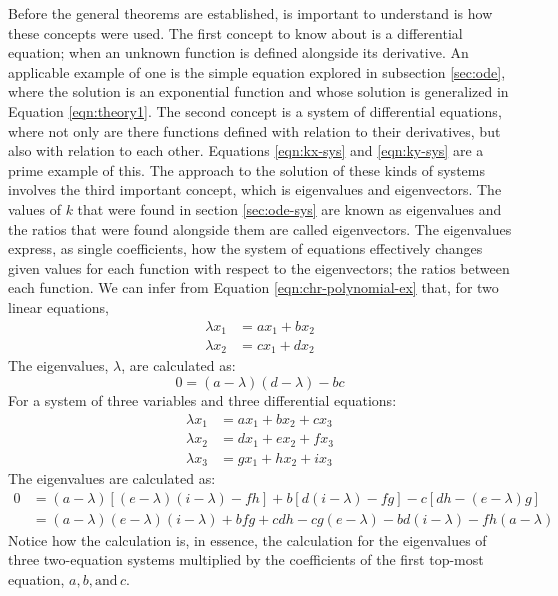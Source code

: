\documentclass[12pt]{article}
\begin{document}
	Before the general theorems are established, is important to understand is how these concepts were used.
	The first concept to know about is a differential equation; when an unknown function is defined alongside its derivative.
	An applicable example of one is the simple equation explored in subsection \ref{sec:ode}, where the solution is an exponential function and whose solution is generalized in Equation \eqref{eqn:theory1}.
	The second concept is a system of differential equations, where not only are there functions defined with relation to their derivatives, but also with relation to each other.
	Equations \eqref{eqn:kx-sys} and \eqref{eqn:ky-sys} are a prime example of this.
	The approach to the solution of these kinds of systems involves the third important concept, which is eigenvalues and eigenvectors.
	The values of $k$ that were found in section \ref{sec:ode-sys} are known as eigenvalues and the ratios that were found alongside them are called eigenvectors.
	The eigenvalues express, as single coefficients, how the system of equations effectively changes given values for each function with respect to the eigenvectors; the ratios between each function.
	We can infer from Equation \eqref{eqn:chr-polynomial-ex} that, for two linear equations,
	\begin{align*}
		\lambda x_1 &= ax_1 + bx_2 \\
		\lambda x_2 &= cx_1 + dx_2
	\end{align*}
	The eigenvalues, $\lambda$, are calculated as:
	\begin{equation}
		0 = (a - \lambda)(d - \lambda) - bc
	\end{equation}
	For a system of three variables and three differential equations:
	\begin{align*}
		\lambda x_1 &= ax_1 + bx_2 + cx_3 \\
		\lambda x_2 &= dx_1 + ex_2 + fx_3 \\
		\lambda x_3 &= gx_1 + hx_2 + ix_3
	\end{align*}
	The eigenvalues are calculated as:
	\begin{align}
		0 &= (a - \lambda)[(e - \lambda)(i - \lambda) - fh] + b[d(i - \lambda) - fg] - c[dh - (e - \lambda)g] \\
		&= (a - \lambda)(e - \lambda)(i - \lambda) + bfg + cdh - cg(e - \lambda) - bd(i - \lambda) - fh(a - \lambda)
	\end{align}
	Notice how the calculation is, in essence, the calculation for the eigenvalues of three two-equation systems multiplied by the coefficients of the first top-most equation, $a, b, \text{and}\, c$.
\end{document}
